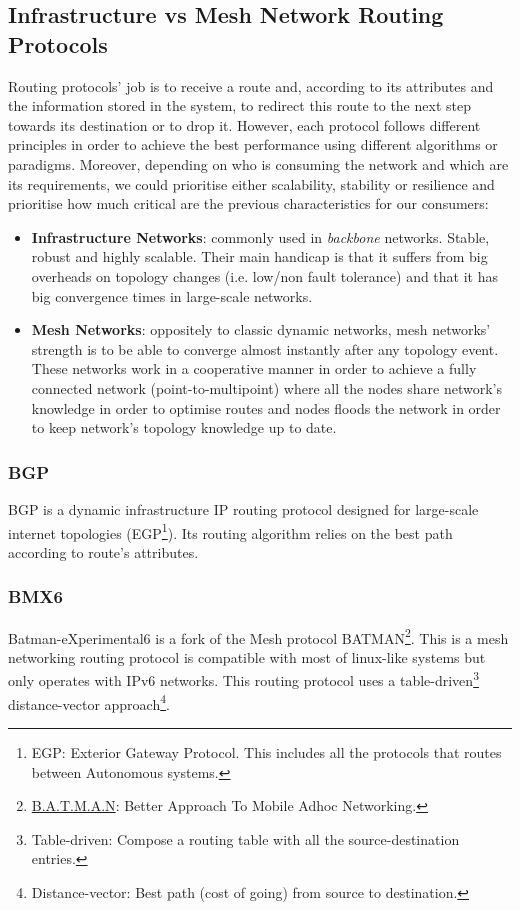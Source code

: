 \subsection{Infrastructure vs Mesh Network Routing Protocols}
\label{subsec:dsrp}
Routing protocols' job is to receive a route and, according to its attributes and the information stored in the system, to redirect this route to the next step towards its destination or to drop it. However, each protocol follows different principles in order to achieve the best performance using different algorithms or paradigms. Moreover, depending on who is consuming the network and which are its requirements, we could prioritise either scalability, stability or resilience and prioritise how much critical are the previous characteristics for our consumers:

\begin{itemize}
    \item \textbf{Infrastructure Networks}: commonly used in \textit{backbone} networks. Stable, robust and highly scalable. Their main handicap is that it suffers from big overheads on topology changes (i.e. low/non fault tolerance) and that it has big convergence times in large-scale networks.
    \item \textbf{Mesh Networks}: oppositely to classic dynamic networks, mesh networks' strength is to be able to converge almost instantly after any topology event. These networks work in a cooperative manner in order to achieve a fully connected network (point-to-multipoint) where all the nodes share network's knowledge in order to optimise routes and nodes floods the network in order to keep network's topology knowledge up to date.
\end{itemize}

\subsubsection{BGP}
\label{subsubsec:bgp}
BGP is a dynamic infrastructure IP routing protocol designed for large-scale internet topologies (EGP\footnote{EGP: Exterior Gateway Protocol. This includes all the protocols that routes between Autonomous systems.}). Its routing algorithm relies on the best path according to route's attributes.

\subsubsection{BMX6}
\label{subsec:bmx6}
Batman-eXperimental6 \cite{bmx6} is a fork of the Mesh protocol BATMAN\footnote{\href{https://www.open-mesh.org/projects/open-mesh/wiki}{B.A.T.M.A.N}: Better Approach To Mobile Adhoc Networking.}. This is a mesh networking routing protocol is compatible with most of linux-like systems but only operates with IPv6 networks. This routing protocol uses a table-driven\footnote{Table-driven: Compose a routing table with all the source-destination entries.} distance-vector approach\footnote{Distance-vector: Best path (cost of going) from source to destination.}.

